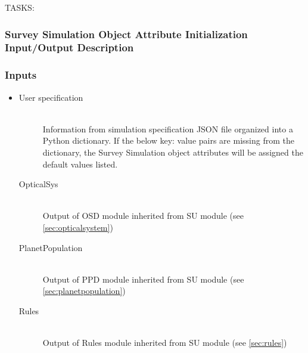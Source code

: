 \documentclass[cleanfoot]{asme2ej}
\begin{document}
TASKS: 

\subsubsection{Survey Simulation Object Attribute Initialization Input/Output Description}
\subsubsection*{Inputs}
\begin{itemize}
    \item 
    \begin{description}
        \item[User specification] \hfill \\
        Information from simulation specification JSON file organized into a Python dictionary. If the below key: value pairs are missing from the dictionary, the Survey Simulation object attributes will be assigned the default values listed.
        \item[OpticalSys] \hfill \\
        Output of OSD module inherited from SU module (see \ref{sec:opticalsystem})
        \item[PlanetPopulation] \hfill \\
        Output of PPD module inherited from SU module (see \ref{sec:planetpopulation})
        \item[Rules] \hfill \\
        Output of Rules module inherited from SU module (see \ref{sec:rules})

\end{description}
\end{itemize}
\end{document}
